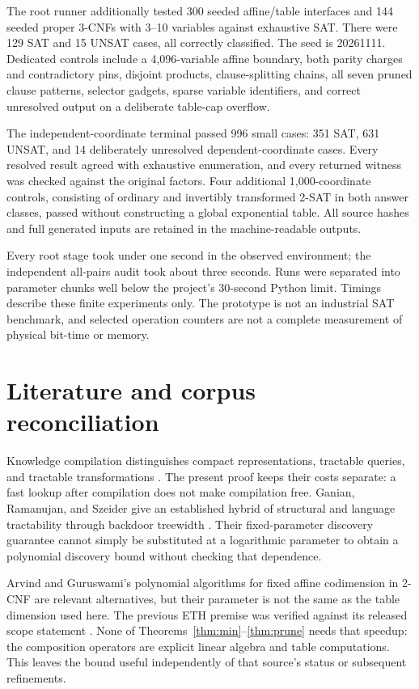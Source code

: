 \documentclass[11pt]{article}
\begin{document}
The root runner additionally tested 300 seeded affine/table interfaces and 144
seeded proper 3-CNFs with 3--10 variables against exhaustive SAT. There were 129
SAT and 15 UNSAT cases, all correctly classified. The seed is 20261111. Dedicated
controls include a 4,096-variable affine boundary, both parity charges and
contradictory pins, disjoint products, clause-splitting chains, all seven pruned
clause patterns, selector gadgets, sparse variable identifiers, and correct
unresolved output on a deliberate table-cap overflow.

The independent-coordinate terminal passed 996 small cases: 351 SAT, 631 UNSAT,
and 14 deliberately unresolved dependent-coordinate cases. Every resolved result
agreed with exhaustive enumeration, and every returned witness was checked against
the original factors. Four additional 1,000-coordinate controls, consisting of
ordinary and invertibly transformed 2-SAT in both answer classes, passed without
constructing a global exponential table. All source hashes and full generated
inputs are retained in the machine-readable outputs.

Every root stage took under one second in the observed environment; the independent
all-pairs audit took about three seconds. Runs were separated into parameter chunks
well below the project's 30-second Python limit. Timings describe these finite
experiments only. The prototype is not an industrial SAT benchmark, and selected
operation counters are not a complete measurement of physical bit-time or memory.

\section{Literature and corpus reconciliation}
Knowledge compilation distinguishes compact representations, tractable queries,
and tractable transformations \cite{DarwicheMarquis2002}. The present proof keeps
their costs separate: a fast lookup after compilation does not make compilation
free. Ganian, Ramanujan, and Szeider give an established hybrid of structural and
language tractability through backdoor treewidth \cite{Ganian2017}. Their
fixed-parameter discovery guarantee cannot simply be substituted at a logarithmic
parameter to obtain a polynomial discovery bound without checking that dependence.

Arvind and Guruswami's polynomial algorithms for fixed affine codimension in
2-CNF \cite{ArvindGuruswami2021} are relevant alternatives, but their parameter
is not the same as the table dimension used here. The previous ETH premise was
verified against its released scope statement \cite{OpenAI2026scope}. None of
Theorems~\ref{thm:min}--\ref{thm:prune} needs that speedup: the composition operators
are explicit linear algebra and table computations. This leaves the bound useful
independently of that source's status or subsequent refinements.
\end{document}
